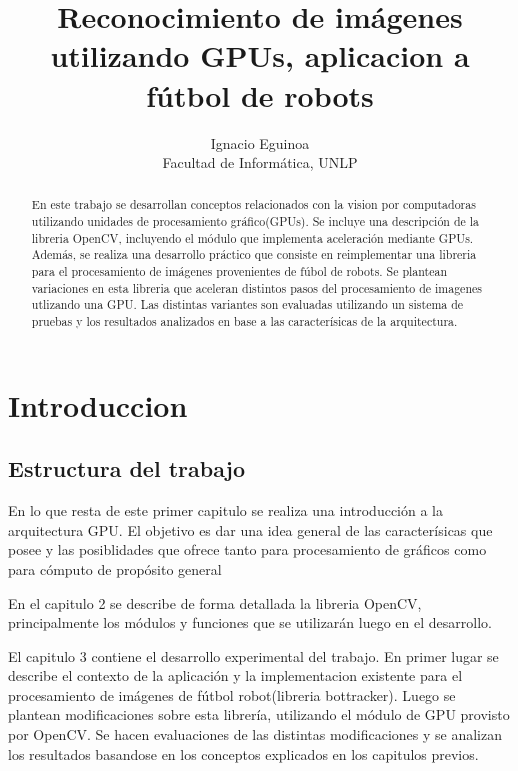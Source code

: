 \documentclass[a4paper,10pt]{report}
\title{Reconocimiento de imágenes utilizando GPUs, aplicacion a fútbol de robots}
\author{Ignacio Eguinoa \\
\small Facultad de Informática, UNLP}
\begin{document}
\maketitle


\begin{abstract}

En este trabajo se desarrollan conceptos relacionados con la vision por computadoras utilizando unidades de procesamiento gráfico(GPUs).
Se incluye una descripción de la libreria OpenCV, incluyendo el módulo que implementa aceleración mediante GPUs.
Además, se realiza una desarrollo práctico que consiste en reimplementar una libreria para el procesamiento de imágenes provenientes de fúbol de robots. 
Se plantean variaciones en esta libreria que aceleran distintos pasos del procesamiento de imagenes utlizando una GPU. 
Las distintas variantes son evaluadas utilizando un sistema de pruebas y los resultados analizados en base a las caracterísicas de la arquitectura.



\end{abstract}


\tableofcontents

\chapter{Introduccion}

\section{Estructura del trabajo}
En lo que resta de este primer capitulo se realiza una introducción a la arquitectura GPU. 
El objetivo es dar una idea general de las caracterísicas que posee y las posiblidades que ofrece tanto para procesamiento de gráficos como para cómputo de propósito general

En el capitulo 2 se describe de forma detallada la libreria OpenCV, principalmente los módulos y funciones que se utilizarán luego en el desarrollo. 

El capitulo 3 contiene el desarrollo experimental del trabajo. En primer lugar se describe el contexto de la aplicación y la implementacion existente para el procesamiento de imágenes de fútbol robot(libreria bottracker).
Luego se plantean modificaciones sobre esta librería, utilizando el módulo de GPU provisto por OpenCV. Se hacen evaluaciones de las distintas modificaciones y se analizan los resultados basandose en los conceptos explicados en los capitulos previos.
\end{document}

